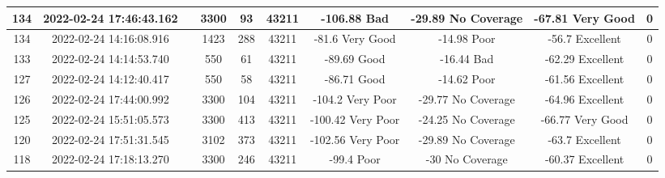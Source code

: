 \begin{longtable*}{|c|c|c|c|c|c|c|c|c|c|}
134&2022-02-24 17:46:43.162&&3300&93&43211& -106.88   Bad         & -29.89    No Coverage & -67.81    Very Good   & 0\\\hline
{}134&2022-02-24 14:16:08.916&&1423&288&43211& -81.6     Very Good   & -14.98    Poor        & -56.7     Excellent   & 0\\\hline
{}133&2022-02-24 14:14:53.740&&550&61&43211& -89.69    Good        & -16.44    Bad         & -62.29    Excellent   & 0\\\hline
{}127&2022-02-24 14:12:40.417&&550&58&43211& -86.71    Good        & -14.62    Poor        & -61.56    Excellent   & 0\\\hline
{}126&2022-02-24 17:44:00.992&&3300&104&43211& -104.2    Very Poor   & -29.77    No Coverage & -64.96    Excellent   & 0\\\hline
{}125&2022-02-24 15:51:05.573&&3300&413&43211& -100.42   Very Poor   & -24.25    No Coverage & -66.77    Very Good   & 0\\\hline
{}120&2022-02-24 17:51:31.545&&3102&373&43211& -102.56   Very Poor   & -29.89    No Coverage & -63.7     Excellent   & 0\\\hline
{}118&2022-02-24 17:18:13.270&&3300&246&43211& -99.4     Poor        & -30       No Coverage & -60.37    Excellent   & 0\\\hline

\end{longtable*}
